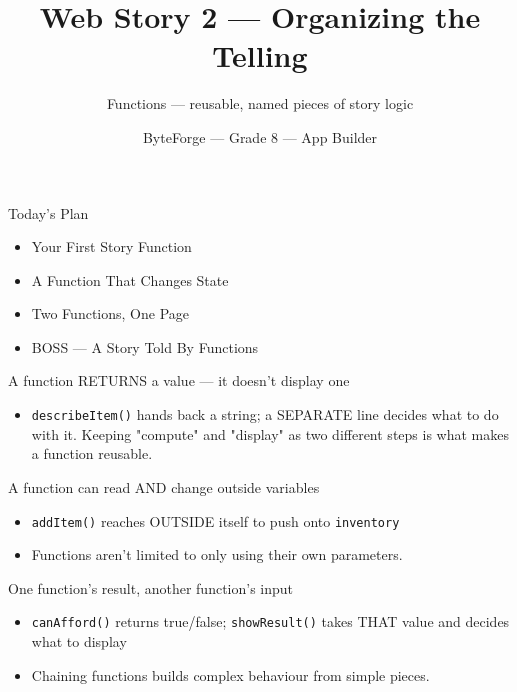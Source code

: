 \documentclass[aspectratio=169]{beamer}
\title{Web Story 2 — Organizing the Telling}
\subtitle{Functions — reusable, named pieces of story logic}
\author{ByteForge --- Grade 8 --- App Builder}
\date{}
\begin{document}
\begin{frame}
    \titlepage
\end{frame}

\begin{frame}{Today's Plan}
    \begin{itemize}
        \item Your First Story Function
        \item A Function That Changes State
        \item Two Functions, One Page
        \item[$\bigstar$] BOSS --- A Story Told By Functions
    \end{itemize}
\end{frame}

\begin{frame}{A function RETURNS a value — it doesn't display one}
    \large
    \begin{itemize}
        \item \texttt{describeItem()} hands back a string; a SEPARATE line decides what to do with it. Keeping "compute" and "display" as two different steps is what makes a function reusable.
    \end{itemize}
\end{frame}


\begin{frame}{A function can read AND change outside variables}
    \large
    \begin{itemize}
        \item \texttt{addItem()} reaches OUTSIDE itself to push onto \texttt{inventory}
        \item Functions aren't limited to only using their own parameters.
    \end{itemize}
\end{frame}


\begin{frame}{One function's result, another function's input}
    \large
    \begin{itemize}
        \item \texttt{canAfford()} returns true/false; \texttt{showResult()} takes THAT value and decides what to display
        \item Chaining functions builds complex behaviour from simple pieces.
    \end{itemize}

    \begin{center}
    \end{center}
\end{frame}
\end{document}
